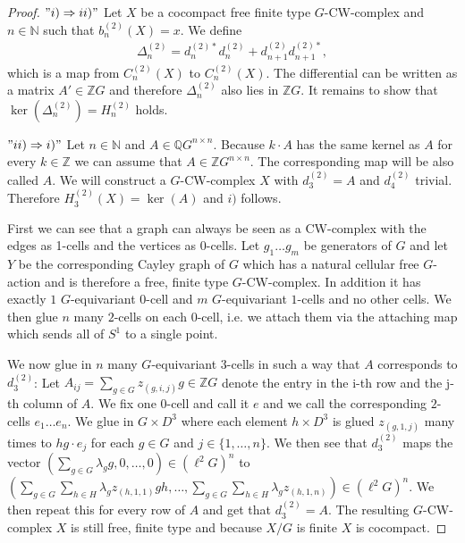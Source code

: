 \documentclass[12pt,a4paper]{scrartcl}
\numberwithin{equation}{section}
\newcommand{\Q}{\mathbb{Q}} %
\newcommand{\Z}{\mathbb{Z}} %
\newcommand{\N}{\mathbb{N}} %
\newcommand{\2}{\mathbb{Z} / 2 \mathbb{Z}}
\newcommand{\1}{\bar{1}}
\newcommand{\0}{\bar{0}}
\begin{document}
\begin{proof}
	$"i) \Rightarrow ii)"$ Let $X$ be a cocompact free finite type $G$-CW-complex and $n \in \N$ such that $b_n^{(2)}(X)=x$. We define 
	\begin{align*}
		\Delta_n^{(2)} = d_n^{(2)*} d_n^{(2)} + d_{n+1}^{(2)} d_{n+1}^{(2)*},
	\end{align*}
	which is a map from $C_n^{(2)}(X)$ to $C_n^{(2)}(X)$. The differential can be written as a matrix $A' \in \Z G$ and therefore $\Delta_n^{(2)}$ also lies in $\Z G$. It remains to show that $\ker(\Delta_n^{(2)}) = H_n^{(2)}$ holds. 
	
	$"ii) \Rightarrow i)"$ Let $n \in \N$ and $A\in \Q G^{n \times n}$. Because $k \cdot A$ has the same kernel as $A$ for every $k \in \Z$ we can assume that $A \in \Z G^{n \times n}$. The corresponding map will be also called $A$. We will construct a $G$-CW-complex $X$ with $d_3^{(2)} = A$ and $d_4^{(2)}$ trivial. Therefore $H_3^{(2)}(X) = \ker(A)$ and $i)$ follows.
	
	First we can see that a graph can always be seen as a CW-complex with the edges as 1-cells and the vertices as 0-cells. Let $g_1 \ldots g_m$ be generators of $G$ and let $Y$ be the corresponding Cayley graph of $G$ which has a natural cellular free $G$-action and is therefore a free, finite type $G$-CW-complex. In addition it has exactly $1$ $G$-equivariant $0$-cell and $m$ $G$-equivariant $1$-cells and no other cells. We then glue $n$ many $2$-cells on each $0$-cell, i.e. we attach them via the attaching map which sends all of $S^1$ to a single point. 
	
	We now glue in $n$ many $G$-equivariant $3$-cells in such a way that $A$ corresponds to $d_3^{(2)}$:
	Let $A_{ij} = \sum_{g \in G} z_{(g, i, j)} g \in \Z G$ denote the entry in the i-th row and the j-th column of $A$. We fix one $0$-cell and call it $e$ and we call the corresponding $2$-cells $e_1 \ldots e_n$. We glue in $G \times D^3$ where each element $h \times D^3$ is glued $z_{(g, 1, j)}$ many times to $h g \cdot e_j$ for each $g \in G$ and $j \in \{1, \ldots, n\}$. We then see that $d_3^{(2)}$ maps the vector $(\sum_{g \in G} \lambda_g g, 0 , \ldots , 0) \in (\ell^2 G)^n$ to $(\sum_{g \in G} \sum_{h \in H} \lambda_g z_{(h, 1, 1)} g h, \ldots , \sum_{g \in G} \sum_{h \in H} \lambda_g z_{(h, 1, n)}) \in (\ell^2 G)^n$. We then repeat this for every row of $A$ and get that $d_3^{(2)} = A$. The resulting $G$-CW-complex $X$ is still free, finite type and because $X/G$ is finite $X$ is cocompact.
\end{proof}
\end{document}
